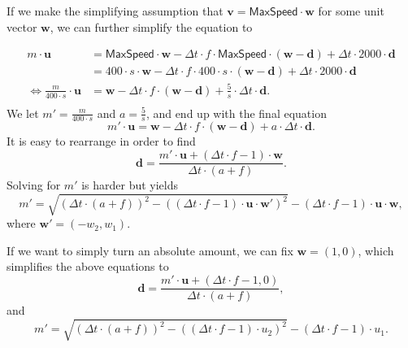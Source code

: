 \documentclass[11pt]{article}
\newcommand{\Dt}{\Delta{}t}
\renewcommand{\Vec}{\bm}
\newcommand{\MaxSpeed}{\textsf{MaxSpeed}}
\begin{document}
If we make the simplifying assumption that $\Vec{v} = \MaxSpeed \cdot \Vec{w}$ for some unit vector
$\Vec{w}$, we can further simplify the equation to

\begin{equation*}
    \begin{split}
        m \cdot \Vec{u} &= \MaxSpeed \cdot \Vec{w}
                                    -  \Dt \cdot f \cdot \MaxSpeed \cdot (\Vec{w} - \Vec{d})
                                    + \Dt \cdot 2000 \cdot \Vec{d} \\
                        &= 400 \cdot s \cdot \Vec{w}
                                    - \Dt \cdot f \cdot 400 \cdot s \cdot (\Vec{w} - \Vec{d})
                                    + \Dt \cdot 2000 \cdot \Vec{d} \\
    \iff
        \frac{m}{400 \cdot s} \cdot \Vec{u} &= \Vec{w} - \Dt \cdot f \cdot (\Vec{w} - \Vec{d})
                                                       + \frac{5}{s} \cdot \Dt \cdot \Vec{d}. \\
    \end{split}
\end{equation*}
We let $m' = \frac{m}{400 \cdot s}$ and $a = \frac{5}{s}$, and end up with the final equation
\begin{equation*}
    m' \cdot \Vec{u} = \Vec{w} - \Dt \cdot f \cdot (\Vec{w} - \Vec{d}) + a \cdot \Dt \cdot \Vec{d}.
\end{equation*}
It is easy to rearrange in order to find
\begin{equation*}
    \Vec{d} = \frac{m' \cdot \Vec{u} + (\Dt \cdot f - 1) \cdot \Vec{w}}{\Dt \cdot (a + f)}.
\end{equation*}
Solving for $m'$ is harder but yields
\begin{equation*}
    m' = \sqrt{(\Dt \cdot (a + f))^{2} - ((\Dt \cdot f - 1) \cdot \Vec{u} \cdot \Vec{w'})^{2}}
       - (\Dt \cdot f - 1) \cdot \Vec{u} \cdot \Vec{w},
\end{equation*}
where $\Vec{w'} = (-w_{2}, w_{1})$.

If we want to simply turn an absolute amount, we can fix $\Vec{w} = (1, 0)$, which simplifies
the above equations to
\begin{equation*}
    \Vec{d} = \frac{m' \cdot \Vec{u} + (\Dt \cdot f - 1, 0)}{\Dt \cdot (a + f)},
\end{equation*}
and
\begin{equation*}
    m' = \sqrt{(\Dt \cdot (a + f))^{2} - ((\Dt \cdot f - 1) \cdot u_{2})^{2}}
       - (\Dt \cdot f - 1) \cdot u_{1}.
\end{equation*}
\end{document}
